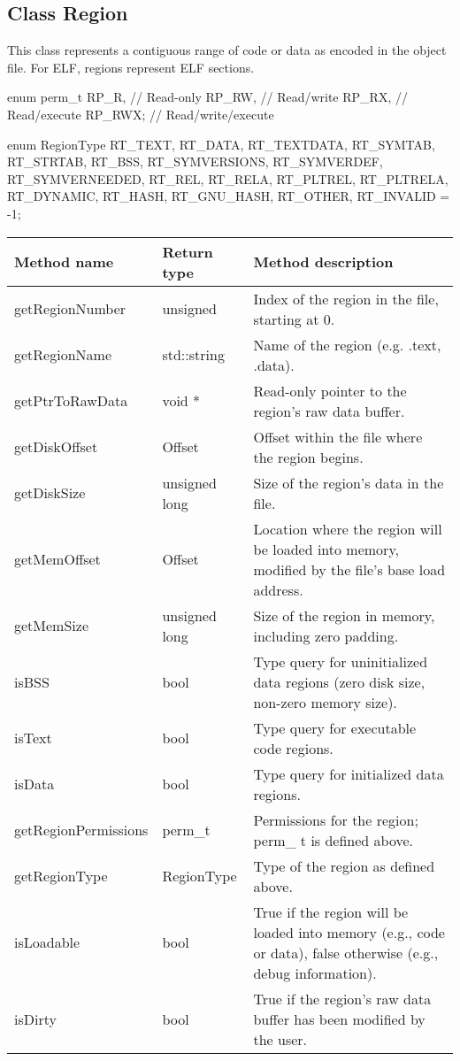 \subsection{Class Region}

This class represents a contiguous range of code or data as encoded in the object file. For ELF, regions represent ELF sections. 

\begin{apient}
enum perm_t{
	RP_R,    // Read-only
	RP_RW,   // Read/write
	RP_RX,   // Read/execute
	RP_RWX}; // Read/write/execute
\end{apient}

\begin{apient}
enum RegionType { 
    RT_TEXT, RT_DATA, RT_TEXTDATA, RT_SYMTAB, RT_STRTAB, RT_BSS, RT_SYMVERSIONS, 
    RT_SYMVERDEF, RT_SYMVERNEEDED, RT_REL, RT_RELA, RT_PLTREL, RT_PLTRELA, 
    RT_DYNAMIC, RT_HASH, RT_GNU_HASH, RT_OTHER, RT_INVALID = -1};
\end{apient}

\begin{tabular}{|p{1.25in}|p{1in}|p{3.25in}|}
	\hline
	Method name & Return type & Method description \\
	\hline
	getRegionNumber & unsigned & Index of the region in the file, starting at 0. \\
	getRegionName & std::string & Name of the region (e.g. .text, .data). \\
	getPtrToRawData & void * & Read-only pointer to the region's raw data buffer. \\
	getDiskOffset & Offset & Offset within the file where the region begins. \\
	getDiskSize & unsigned long & Size of the region's data in the file. \\
	getMemOffset & Offset & Location where the region will be loaded into memory, modified by the file's base load address. \\
	getMemSize & unsigned long & Size of the region in memory, including zero padding. \\
	isBSS & bool & Type query for uninitialized data regions (zero disk size, non-zero memory size). \\
	isText & bool & Type query for executable code regions. \\
	isData & bool & Type query for initialized data regions. \\
	getRegionPermissions & perm\_t & Permissions for the region; perm\_ t is defined above. \\
	getRegionType & RegionType & Type of the region as defined above. \\
	isLoadable & bool & True if the region will be loaded into memory (e.g., code or data), false otherwise (e.g., debug information). \\
	isDirty & bool & True if the region's raw data buffer has been modified by the user. \\
	\hline
\end{tabular}

